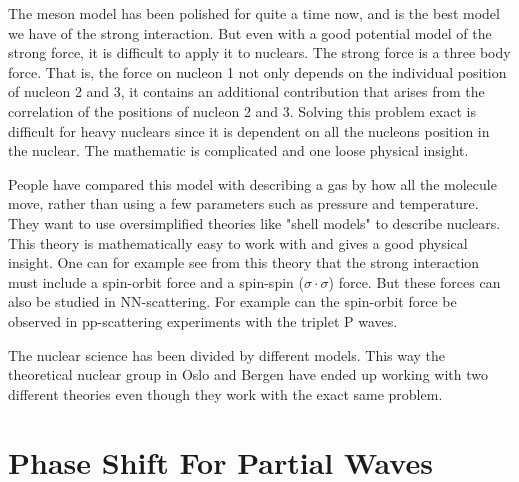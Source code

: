 
The meson model has been polished for quite a time now, and is the best model we have of
the strong interaction.
But even with a good potential model of the strong force, it is difficult to apply it to nuclears. 
The strong force is a three body force. That is, the force on nucleon 1 not only depends on the individual
position of nucleon 2 and 3, it contains an additional contribution that arises from the correlation 
of the positions of nucleon 2 and 3. 
Solving this problem exact is difficult for heavy nuclears since it is dependent on all the nucleons position in the nuclear.
The mathematic is complicated and one loose physical insight.

People have compared this model with describing a gas by how all the molecule move, rather than using a few parameters such as 
pressure and temperature. They want to use oversimplified theories like  "shell models" to describe nuclears. 
This theory is mathematically easy to work with and gives a good physical insight. 
One can for example see from this theory that the strong interaction must include a spin-orbit force and a
spin-spin ($\sigma\cdot\sigma$) force. But these forces can also be studied in 
NN-scattering. For example can the spin-orbit
force be observed in pp-scattering experiments with the triplet P waves. 

The nuclear science has been divided by different models.
This way the theoretical nuclear group in Oslo and Bergen have ended up working with two different theories even though 
they work with the exact same problem.  

\section{Phase Shift For Partial Waves} 

